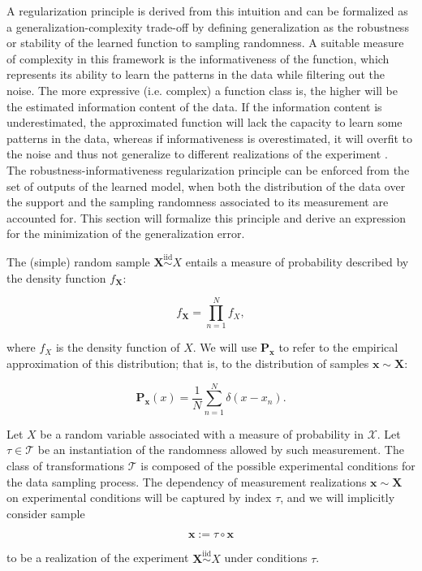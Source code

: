 A regularization principle is derived from this intuition and can be formalized as a
generalization-complexity trade-off by defining generalization as the robustness or stability
of the learned function to sampling randomness. A suitable measure of complexity in this framework
is the informativeness of the function, which represents its ability to learn the patterns in the
data while filtering out the noise. The more expressive (i.e. complex) a function class is,
the higher will be the estimated information content of the data. If the information content is
underestimated, the approximated function will lack the capacity to learn some patterns in
the data, whereas if informativeness is overestimated, it will overfit to the noise and 
thus not generalize to different realizations of the experiment
\cite{chehreghaniInformationTheoreticModel,buhmannInformationTheoreticModel,buhmannInformationTheoreticModel2010}. \\

The robustness-informativeness regularization principle can be enforced from the set 
of outputs of the learned model, when both the distribution of the data over the support 
and the sampling randomness associated to its measurement are accounted for. This section 
will formalize this principle and derive an expression for the minimization of
the generalization error.

\begin{definition}\label{def:data_distribution}
    The (simple) random sample $\bm{X} \overset{\text{iid}}{\sim} X$ entails a measure of probability
    described by the density function $f_{\bm{X}}$:

    $$
     f_{\bm{X}} = \prod_{n=1}^{N} f_{X},
    $$

    where $f_{X}$ is the density function of $X$. We will use $\mathbf{P}_{\bm{x}}$ to refer to the empirical approximation of this distribution; 
    that is, to the distribution of samples $\bm{x} \sim \bm{X}$:

    $$
    \mathbf{P}_{\bm{x}}(x) = \frac{1}{N} \sum_{n=1}^{N} \delta(x - x_n).
    $$

\end{definition}

\begin{definition}\label{def:sample}
    Let $X$ be a random variable associated with a measure of probability
    in $\mathcal{X}$. Let $\tau \in \mathcal{T}$ be an instantiation of the randomness allowed
    by such measurement. The class of transformations $\mathcal{T}$ is composed
    of the possible experimental conditions for the data sampling 
    process. The dependency of measurement 
    realizations $\bm{x} \sim \bm{X}$ on experimental conditions 
    will be captured by index $\tau$, and we will implicitly consider sample
    
    $$
        \bm{x} := \tau \circ \bm{x}
    $$

    to be a realization of the experiment $\bm{X} \overset{\text{iid}}{\sim} X$ under conditions $\tau$.
\end{definition}

